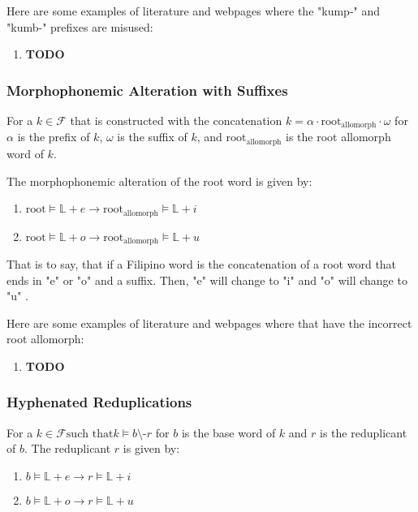 \begin{example}
    Here are some examples of literature and webpages where the "kump-" and "kumb-"
    prefixes are misused:
\end{example}
\begin{enumerate}
    \item \textbf{TODO}
\end{enumerate}

\subsubsection{Morphophonemic Alteration with Suffixes}

For a \(k \in \mathcal{F}\) that is constructed with  the concatenation
\(k = \alpha \cdot \text{root}_\text{allomorph} \cdot \omega \)
for \(\alpha\) is the prefix of \(k\), \(\omega\) is the suffix of \(k\),
and \(\text{root}_\text{allomorph}\) is the root allomorph word of \(k\).

The morphophonemic alteration of the root word is given by:
\begin{enumerate}
    \item \(\text{root} \models \mathbb{L}+e \rightarrow
          \text{root}_\text{allomorph} \models \mathbb{L}+i \)
    \item \(\text{root} \models \mathbb{L}+o \rightarrow
          \text{root}_\text{allomorph} \models \mathbb{L}+u \)
\end{enumerate}

That is to say, that if a Filipino word is the concatenation of a root word that
ends in "e" or "o" and a suffix. Then, "e" will change to "i" and "o" will change
to "u" \cite{Yap_1967}.

Here are some examples of literature and webpages where that have the incorrect
root allomorph:
\begin{enumerate}
    \item \textbf{TODO}
\end{enumerate}

\subsubsection{Hyphenated Reduplications}

For a \(k \in \mathcal{F} \text{such that} k\models b\text{\textbackslash-} r\)
for \(b\) is the base word of \(k\) and \(r\) is the reduplicant of \(b\). The
reduplicant \(r\) is given by:

\begin{enumerate}
    \item \(b\models \mathbb{L}+e \rightarrow r\models\mathbb{L}+i\)
    \item \(b\models \mathbb{L}+o \rightarrow r\models\mathbb{L}+u\)
\end{enumerate}


